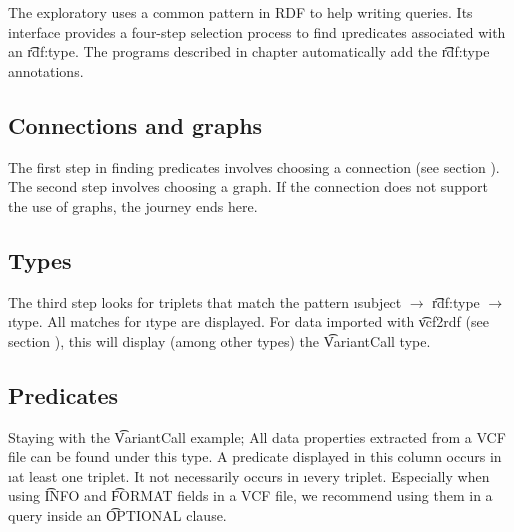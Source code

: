  The exploratory uses a common pattern in RDF to help writing queries.  Its
  interface provides a four-step selection process to find \i{predicates}
  associated with an \t{rdf:type}.  The programs described in chapter
   automatically add the \t{rdf:type} annotations.

\subsection{Connections and graphs}

  The first step in finding predicates involves choosing a connection
  (see section ).  The second step involves
  choosing a graph.  If the connection does not support the use of graphs,
  the journey ends here.

\subsection{Types}

  The third step looks for triplets that match the pattern \i{subject}
  $\rightarrow$ \t{rdf:type} $\rightarrow$ \i{type}.  All matches for
  \i{type} are displayed.  For data imported with \t{vcf2rdf} (see
  section ), this will display (among other types) the
  \t{VariantCall} type.

\subsection{Predicates}

  Staying with the \t{VariantCall} example;  All data properties extracted
  from a VCF file can be found under this type.  A predicate displayed in this
  column occurs in \i{at least} one triplet.  It not necessarily occurs in
  \i{every} triplet.  Especially when using \t{INFO} and \t{FORMAT}
  fields in a VCF file, we recommend using them in a query inside an
  \t{OPTIONAL} clause.

\pagebreak{}


\pagebreak{}

